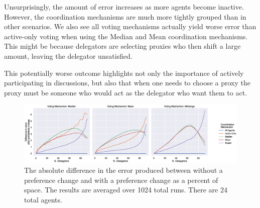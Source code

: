Unsurprisingly, the amount of error increases as more agents become inactive.
However, the coordination mechanisms are much more tightly grouped than in other
scenarios.
We also see all voting mechanisms actually yield worse error than active-only
voting when using the Median and Mean coordination mechanisms.
This might be because delegators are selecting proxies who then shift a large amount,
leaving the delegator unsatisfied.

This potentially worse outcome highlights not only the importance of actively
participating in discussions, but also that when one needs to choose a proxy the
proxy must be someone who would act as the delegator who want them to act.

\begin{landscape}
    \begin{figure}[p]
        \centering
        \includegraphics[scale=0.55]
        {content/chapter2/figures/abs_diff_from_preference_change_error_as_percent_of_space_abs_mean}
        \caption{
            The absolute difference in the error produced between without a
            preference change and with a preference change as a percent of space.
            The results are averaged over 1024 total runs.
            There are 24 total agents.
        }
        \label{fig:abs-diff-from-preference-change-error-as-percent-of-space-abs-mean}
    \end{figure}
\end{landscape}
